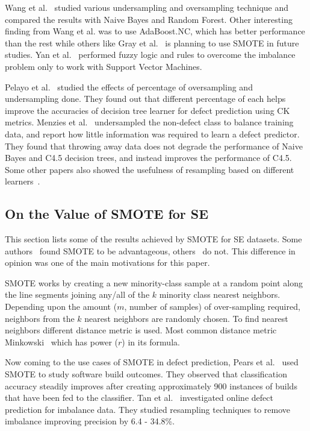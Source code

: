 \documentclass[sigconf,review, anonymous]{acmart}
\theoremstyle{break}
\theoremstyle{break}
\begin{document}
Wang et al.~\cite{wang2013using} studied various undersampling and oversampling technique and compared the results with Naive Bayes and Random Forest. Other interesting finding from Wang et al. was to use AdaBoost.NC, which has better performance than the rest while others like Gray et al.~\cite{gray2009using} is planning to use SMOTE in future studies. Yan et al.~\cite{yan2010software} performed fuzzy logic and rules to overcome the imbalance problem only to work with Support Vector Machines. 

Pelayo et al.~\cite{pelayo2007applying} studied the effects of percentage of oversampling and undersampling done. They found out that different percentage of each helps improve the accuracies of decision tree learner for defect prediction using CK metrics. Menzies et al.~\cite{menzies2008implications} undersampled the non-defect class to balance training
data, and report how little information was required to learn a defect predictor. They found that throwing away data does not degrade the performance of Naive Bayes and C4.5 decision trees, and instead improves the performance of C4.5. Some other papers also showed the usefulness of resampling based on different learners~\cite{pelayo2007applying, pelayo2012evaluating, riquelme2008finding}.

\subsection{On the Value of SMOTE for SE}
\label{sect:smote}

This section lists some of the results achieved by SMOTE for SE datasets. Some authors~\cite{van2007experimental, tan2015online} found SMOTE to be advantageous, others~\cite{pelayo2007applying} do not. This 
difference in opinion was one of the main motivations
for this paper.

SMOTE works by creating a new minority-class sample at a random point along the line
segments joining any/all of the $k$ minority class nearest neighbors. Depending upon the
amount ($m$, number of samples) of over-sampling required, neighbors from the $k$ nearest neighbors are randomly
chosen. To find nearest neighbors different distance metric is used. Most common distance metric Minkowski~\cite{deza2009encyclopedia} which has power ($r$) in its formula.

Now coming to the use cases of SMOTE in defect prediction, Pears et al.~\cite{pears2014synthetic} used SMOTE to study software build outcomes. They observed
that classification accuracy steadily improves after creating approximately 900 instances of builds that have been fed to the classifier. Tan et al.~\cite{tan2015online} investigated online defect prediction for imbalance data. They studied resampling techniques to remove imbalance improving precision by 6.4 - 34.8\%.
\end{document}
